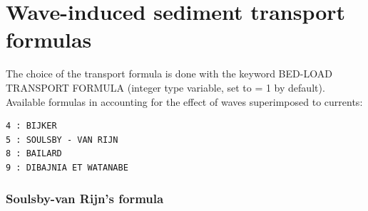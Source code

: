 \section{Wave-induced sediment transport formulas}
The choice of the transport formula is done with the keyword {\ttfamily BED-LOAD TRANSPORT FORMULA} (integer type variable, set to {\ttfamily = 1} by default). Available formulas in \gaia{} accounting for the effect of waves superimposed to currents:
\begin{lstlisting}[frame=trBL]
4 : BIJKER
5 : SOULSBY - VAN RIJN
8 : BAILARD
9 : DIBAJNIA ET WATANABE
\end{lstlisting}

\subsubsection{Soulsby-van Rijn's formula}
